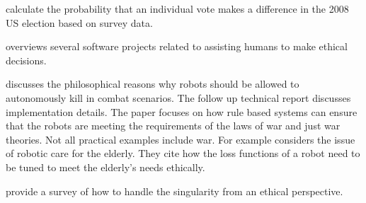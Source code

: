 \documentclass{article}
\theoremstyle{definition}
\begin{document}
\cite{gelman2012probability} calculate the probability that an individual vote makes a difference in the 2008 US election based on survey data.

\cite{mclaren2006computational} overviews several software projects related to assisting humans to make ethical decisions.

\cite{arkin2008governing} discusses the philosophical reasons why robots should be allowed to autonomously kill in combat scenarios.
The follow up technical report \citet{arkin2008governing} discusses implementation details.
The paper focuses on how rule based systems can ensure that the robots are meeting the requirements of the laws of war and just war theories.
Not all practical examples include war.
For example \cite{sharkey2012granny} considers the issue of robotic care for the elderly.
They cite how the loss functions of a robot need to be tuned to meet the elderly's needs ethically.

\cite{sotala2015responses} provide a survey of how to handle the singularity from an ethical perspective.



\end{document}
